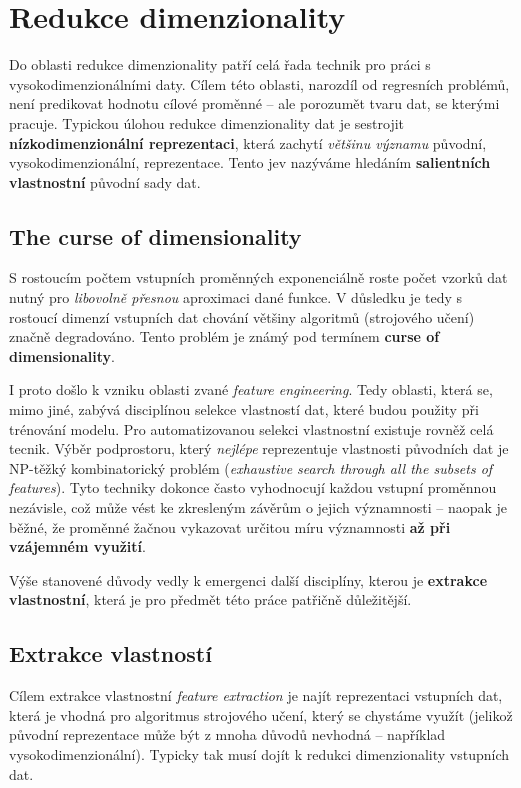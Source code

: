 \section{Redukce dimenzionality}
\label{sec:dimensionality_reduction}

Do oblasti redukce dimenzionality patří celá řada technik pro práci s vysokodimenzionálními daty.
Cílem této oblasti, narozdíl od regresních problémů, není predikovat hodnotu cílové proměnné – ale porozumět tvaru dat, se kterými pracuje.
Typickou úlohou redukce dimenzionality dat je sestrojit \textbf{nízkodimenzionální reprezentaci}, která zachytí \emph{většinu významu} původní, vysokodimenzionální, reprezentace.
Tento jev nazýváme hledáním \textbf{salientních vlastnostní} původní sady dat. \cite{Phillips2021}

\subsection{The curse of dimensionality}
S rostoucím počtem vstupních proměnných exponenciálně roste počet vzorků dat nutný pro \emph{libovolně přesnou} aproximaci dané funkce.
V důsledku je tedy s rostoucí dimenzí vstupních dat chování většiny algoritmů (strojového učení) značně degradováno.
Tento problém je známý pod termínem \textbf{curse of dimensionality}. \cite{Bellman1957}

I proto došlo k vzniku oblasti zvané \emph{feature engineering}.
Tedy oblasti, která se, mimo jiné, zabývá disciplínou selekce vlastností dat, které budou použity při trénování modelu.
Pro automatizovanou selekci vlastnostní existuje rovněž celá tecnik.
Výběr podprostoru, který \emph{nejlépe} reprezentuje vlastnosti původních dat je NP-těžký kombinatorický problém (\emph{exhaustive search through all the subsets of features}).
Tyto techniky dokonce často vyhodnocují každou vstupní proměnnou nezávisle, což může vést ke zkresleným závěrům o jejich významnosti – naopak je běžné, že proměnné žačnou vykazovat určitou míru významnosti \textbf{až při vzájemném využití}. \cite{Stanczyk2015}

Výše stanovené důvody vedly k emergenci další disciplíny, kterou je \textbf{extrakce vlastnostní}, která je pro předmět této práce patřičně důležitější.

\subsection{Extrakce vlastností}
Cílem extrakce vlastnostní \emph{feature extraction} je najít reprezentaci vstupních dat, která je vhodná pro algoritmus strojového učení, který se chystáme využít (jelikož původní reprezentace může být z mnoha důvodů nevhodná – například vysokodimenzionální).
Typicky tak musí dojít k redukci dimenzionality vstupních dat. \cite{Liu1998}

